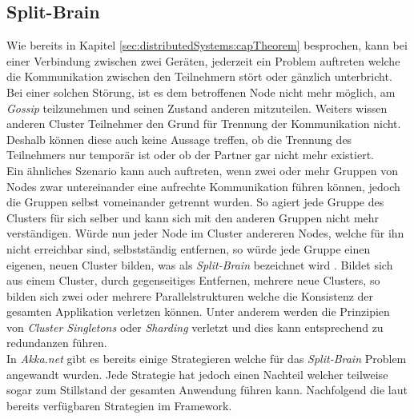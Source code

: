 \subsection{Split-Brain} 
\label{subsec:implementation:splitBrain}
Wie bereits in Kapitel \ref{sec:distributedSystems:capTheorem} besprochen, kann bei einer Verbindung zwischen zwei Geräten, jederzeit ein Problem auftreten welche die Kommunikation zwischen den Teilnehmern stört oder gänzlich unterbricht. Bei einer solchen Störung, ist es dem betroffenen Node nicht mehr möglich, am \textit{Gossip} teilzunehmen und seinen Zustand anderen mitzuteilen. Weiters wissen anderen Cluster Teilnehmer den Grund für Trennung der Kommunikation nicht. Deshalb können diese auch keine Aussage treffen, ob die Trennung des Teilnehmers nur temporär ist oder ob der Partner gar nicht mehr existiert. \\
Ein ähnliches Szenario kann auch auftreten, wenn zwei oder mehr Gruppen von Nodes zwar untereinander eine aufrechte Kommunikation führen können, jedoch die Gruppen selbst vomeinander getrennt wurden. So agiert jede Gruppe des Clusters für sich selber und kann sich  mit den anderen Gruppen nicht mehr verständigen. Würde nun jeder Node im Cluster andereren Nodes, welche für ihn nicht erreichbar sind, selbstständig entfernen, so würde jede Gruppe einen eigenen, neuen Cluster bilden, was als \textit{Split-Brain} bezeichnet wird \citep{networkIsReliable}. Bildet sich aus einem Cluster, durch gegenseitiges Entfernen, mehrere neue Clusters, so bilden sich zwei oder mehrere Parallelstrukturen welche die Konsistenz der gesamten Applikation verletzen können. Unter anderem werden die Prinzipien von \textit{Cluster Singletons} oder \textit{Sharding} verletzt und dies kann entsprechend zu redundanzen führen. \\
In \textit{Akka.net} gibt es bereits einige Strategieren welche für das \textit{Split-Brain} Problem angewandt wurden. Jede Strategie hat jedoch einen Nachteil welcher teilweise sogar zum Stillstand der gesamten Anwendung führen kann. Nachfolgend die laut \cite{Akka.netCommunityAkka.NETDocumentation} bereits verfügbaren Strategien im Framework.
